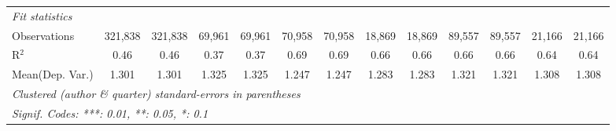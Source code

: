 \begin{tabular}{lcccccccccccc}
   \midrule
   \emph{Fit statistics}\\
   Observations                             & 321,838       & 321,838       & 69,961        & 69,961      & 70,958       & 70,958        & 18,869       & 18,869        & 89,557  & 89,557  & 21,166       & 21,166\\  
   R$^2$                                    & 0.46          & 0.46          & 0.37          & 0.37        & 0.69         & 0.69          & 0.66         & 0.66          & 0.66    & 0.66    & 0.64         & 0.64\\  
Mean(Dep. Var.) & 1.301 & 1.301 & 1.325 & 1.325 & 1.247 & 1.247 & 1.283 & 1.283 & 1.321 & 1.321 & 1.308 & 1.308 \\
   \midrule \midrule
   \multicolumn{13}{l}{\emph{Clustered (author \& quarter) standard-errors in parentheses}}\\
   \multicolumn{13}{l}{\emph{Signif. Codes: ***: 0.01, **: 0.05, *: 0.1}}\\
\end{tabular}
\par\endgroup
